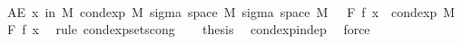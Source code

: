 \begin{isabellebody}
\ \ \isamarkupfalse%
\ {\isachardoublequoteopen}AE\ x\ in\ M{\isachardot}{\kern0pt}\ cond{\isacharunderscore}{\kern0pt}exp\ M\ {\isacharparenleft}{\kern0pt}sigma\ {\isacharparenleft}{\kern0pt}space\ M{\isacharparenright}{\kern0pt}\ {\isacharparenleft}{\kern0pt}sigma\ {\isacharparenleft}{\kern0pt}space\ M{\isacharparenright}{\kern0pt}\ {\isacharbraceleft}{\kern0pt}{\isacharbraceright}{\kern0pt}\ {\isasymunion}\ F{\isacharparenright}{\kern0pt}{\isacharparenright}{\kern0pt}\ f\ x\ {\isacharequal}{\kern0pt}\ cond{\isacharunderscore}{\kern0pt}exp\ M\ F\ f\ x{\isachardoublequoteclose}\ \isamarkupfalse%
\ {\isacharparenleft}{\kern0pt}rule\ cond{\isacharunderscore}{\kern0pt}exp{\isacharunderscore}{\kern0pt}sets{\isacharunderscore}{\kern0pt}cong{\isacharparenright}{\kern0pt}\isanewline
\ \ \isamarkupfalse%
\ {\isacharquery}{\kern0pt}thesis\ \isamarkupfalse%
\ cond{\isacharunderscore}{\kern0pt}exp{\isacharunderscore}{\kern0pt}indep\ \isamarkupfalse%
\ force\isanewline
{}\isamarkupfalse%
%
\endisatagproof
{\isafoldproof}%
%
\isadelimproof
\isanewline
%
\endisadelimproof
%
\isadelimtheory
\isanewline
%
\endisadelimtheory
%
\isatagtheory
{}\isamarkupfalse%
%
\endisatagtheory
{\isafoldtheory}%
%
\isadelimtheory
%
\endisadelimtheory
%
\end{isabellebody}%
\endinput
